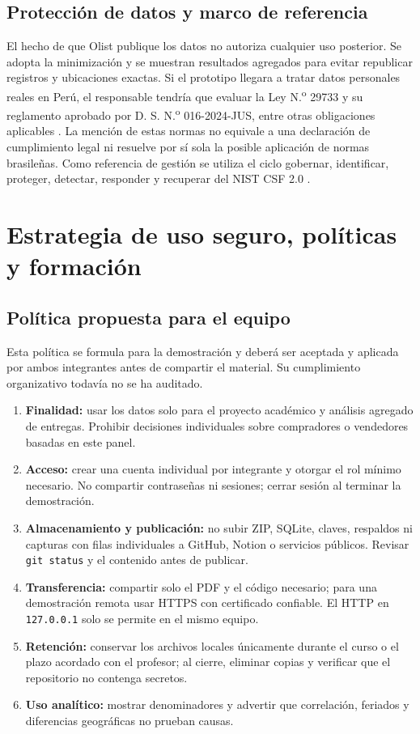 \documentclass[12pt,a4paper]{article}
\begin{document}
\subsection{Protección de datos y marco de referencia}
El hecho de que Olist publique los datos no autoriza cualquier uso posterior. Se adopta la minimización y se muestran resultados agregados para evitar republicar registros y ubicaciones exactas. Si el prototipo llegara a tratar datos personales reales en Perú, el responsable tendría que evaluar la Ley N.\textsuperscript{o} 29733 y su reglamento aprobado por D. S. N.\textsuperscript{o} 016-2024-JUS, entre otras obligaciones aplicables \cite{peru}. La mención de estas normas no equivale a una declaración de cumplimiento legal ni resuelve por sí sola la posible aplicación de normas brasileñas. Como referencia de gestión se utiliza el ciclo gobernar, identificar, proteger, detectar, responder y recuperar del NIST CSF 2.0 \cite{nistcsf}.

\section{Estrategia de uso seguro, políticas y formación}
\subsection{Política propuesta para el equipo}
Esta política se formula para la demostración y deberá ser aceptada y aplicada por ambos integrantes antes de compartir el material. Su cumplimiento organizativo todavía no se ha auditado.
\begin{enumerate}
\item \textbf{Finalidad:} usar los datos solo para el proyecto académico y análisis agregado de entregas. Prohibir decisiones individuales sobre compradores o vendedores basadas en este panel.
\item \textbf{Acceso:} crear una cuenta individual por integrante y otorgar el rol mínimo necesario. No compartir contraseñas ni sesiones; cerrar sesión al terminar la demostración.
\item \textbf{Almacenamiento y publicación:} no subir ZIP, SQLite, claves, respaldos ni capturas con filas individuales a GitHub, Notion o servicios públicos. Revisar \texttt{git status} y el contenido antes de publicar.
\item \textbf{Transferencia:} compartir solo el PDF y el código necesario; para una demostración remota usar HTTPS con certificado confiable. El HTTP en \texttt{127.0.0.1} solo se permite en el mismo equipo.
\item \textbf{Retención:} conservar los archivos locales únicamente durante el curso o el plazo acordado con el profesor; al cierre, eliminar copias y verificar que el repositorio no contenga secretos.
\item \textbf{Uso analítico:} mostrar denominadores y advertir que correlación, feriados y diferencias geográficas no prueban causas.
\end{enumerate}
\end{document}
